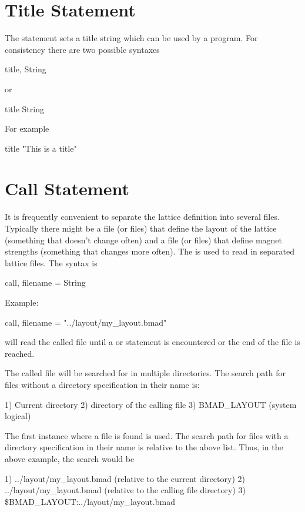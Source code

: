 \section{Title Statement}

The  statement sets a title string which can be used by a program. 
For consistency there are two possible syntaxes
\begin{example}
  title, String
\end{example}
or
\begin{example}
  title
  String
\end{example}
For example
\begin{example}
  title
  "This is a title"
\end{example}

\section{Call Statement}

It is frequently convenient to separate the lattice definition into
several files.  Typically there might be a file (or files) that define
the layout of the lattice (something that doesn't change often) and a
file (or files) that define magnet strengths (something that changes
more often).  The  is used to read in separated lattice
files. The syntax is
\begin{example}
  call, filename = String
\end{example}
Example:
\begin{example}
  call, filename = "../layout/my_layout.bmad"
\end{example}
\bmad will read the called file until a  or 
statement is encountered or the end of the file is reached.

The called file will be searched for in multiple directories.
The search path for files without a directory specification in their name is:
\begin{example}
	1) Current directory
	2) directory of the calling file
	3) BMAD_LAYOUT (system logical)
\end{example}
The first instance where a file is found is used.
The search path for files with a directory specification in their name
is relative to the above list. Thus, in the above example, the search
would be
\begin{example}
  1) ../layout/my_layout.bmad  (relative to the current directory)
  2) ../layout/my_layout.bmad  (relative to the calling file directory)
  3) \$BMAD_LAYOUT:../layout/my_layout.bmad 
\end{example}


